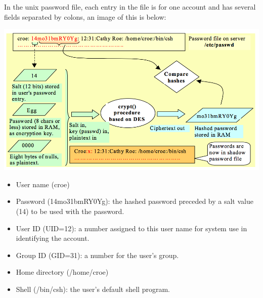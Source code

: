 \documentclass{article}
\begin{document}
In the unix password file, each entry in the file is for one account and has several fields separated by colons, an image of this is below:
\begin{center}
  \includegraphics[scale=0.6]{unix-pass.png}
\end{center}
\begin{itemize}
  \item User name (croe)
  \item Password (14mo31bmRY0Yg): the hashed password preceded by a salt value (14) to be used with the password.
  \item User ID (UID=12): a number assigned to this user name for system use in identifying the account.
  \item Group ID (GID=31): a number for the user's group.
  \item Home directory (/home/croe)
  \item Shell (/bin/csh): the user's default shell program.
\end{itemize}
\end{document}
